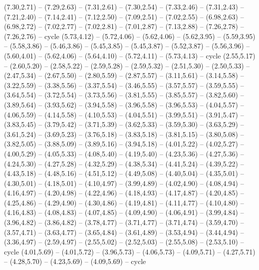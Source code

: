 \expandafter\def\csname geo:gebiet:FJI\endcsname{
  }
\expandafter\def\csname geo:gebiet:TZA\endcsname{
  (7.30,2.71) -- (7.29,2.63) -- (7.31,2.61) -- (7.30,2.54) -- (7.33,2.46) -- (7.31,2.43) -- (7.21,2.40) -- (7.14,2.41) -- (7.12,2.50) -- (7.09,2.51) -- (7.02,2.55) -- (6.98,2.63) -- (6.98,2.72) -- (7.02,2.77) -- (7.02,2.81) -- (7.01,2.87) -- (7.13,2.88) -- (7.26,2.78) -- (7.26,2.76) -- cycle}
\expandafter\def\csname geo:gebiet:SAH\endcsname{
  (5.73,4.12) -- (5.72,4.06) -- (5.62,4.06) -- (5.62,3.95) -- (5.59,3.95) -- (5.58,3.86) -- (5.46,3.86) -- (5.45,3.85) -- (5.45,3.87) -- (5.52,3.87) -- (5.56,3.96) -- (5.60,4.01) -- (5.62,4.06) -- (5.64,4.10) -- (5.72,4.11) -- (5.73,4.13) -- cycle}
\expandafter\def\csname geo:gebiet:CAN\endcsname{
  (2.55,5.17) -- (2.60,5.20) -- (2.58,5.22) -- (2.59,5.28) -- (2.59,5.32) -- (2.51,5.30) -- (2.50,5.33) -- (2.47,5.34) -- (2.67,5.50) -- (2.80,5.59) -- (2.87,5.57) -- (3.11,5.61) -- (3.14,5.58) -- (3.22,5.59) -- (3.38,5.56) -- (3.37,5.54) -- (3.46,5.55) -- (3.57,5.57) -- (3.59,5.55) -- (3.64,5.54) -- (3.72,5.54) -- (3.73,5.56) -- (3.81,5.55) -- (3.85,5.57) -- (3.82,5.60) -- (3.89,5.64) -- (3.93,5.62) -- (3.94,5.58) -- (3.96,5.58) -- (3.96,5.53) -- (4.04,5.57) -- (4.06,5.59) -- (4.14,5.58) -- (4.10,5.53) -- (4.04,5.51) -- (3.99,5.51) -- (3.91,5.47) -- (3.83,5.45) -- (3.79,5.42) -- (3.71,5.39) -- (3.62,5.33) -- (3.59,5.30) -- (3.63,5.29) -- (3.61,5.24) -- (3.69,5.23) -- (3.76,5.18) -- (3.83,5.18) -- (3.81,5.15) -- (3.80,5.08) -- (3.82,5.05) -- (3.88,5.09) -- (3.89,5.16) -- (3.94,5.18) -- (4.01,5.22) -- (4.02,5.27) -- (4.00,5.29) -- (4.05,5.33) -- (4.08,5.40) -- (4.19,5.40) -- (4.23,5.36) -- (4.27,5.36) -- (4.24,5.30) -- (4.27,5.28) -- (4.32,5.29) -- (4.38,5.34) -- (4.41,5.24) -- (4.39,5.22) -- (4.43,5.18) -- (4.48,5.16) -- (4.51,5.12) -- (4.49,5.08) -- (4.40,5.04) -- (4.35,5.01) -- (4.30,5.01) -- (4.18,5.01) -- (4.10,4.97) -- (3.99,4.89) -- (4.02,4.90) -- (4.08,4.94) -- (4.16,4.97) -- (4.20,4.98) -- (4.22,4.96) -- (4.18,4.93) -- (4.17,4.87) -- (4.20,4.85) -- (4.25,4.86) -- (4.29,4.90) -- (4.30,4.86) -- (4.19,4.81) -- (4.11,4.77) -- (4.10,4.80) -- (4.16,4.83) -- (4.08,4.83) -- (4.07,4.85) -- (4.09,4.90) -- (4.06,4.91) -- (3.99,4.84) -- (3.96,4.82) -- (3.86,4.82) -- (3.78,4.77) -- (3.71,4.77) -- (3.71,4.74) -- (3.59,4.70) -- (3.57,4.71) -- (3.63,4.77) -- (3.65,4.84) -- (3.61,4.89) -- (3.53,4.94) -- (3.44,4.94) -- (3.36,4.97) -- (2.59,4.97) -- (2.55,5.02) -- (2.52,5.03) -- (2.55,5.08) -- (2.53,5.10) -- cycle
  (4.01,5.69) -- (4.01,5.72) -- (3.96,5.73) -- (4.06,5.73) -- (4.09,5.71) -- (4.27,5.71) -- (4.28,5.70) -- (4.23,5.69) -- (4.09,5.69) -- cycle
}
